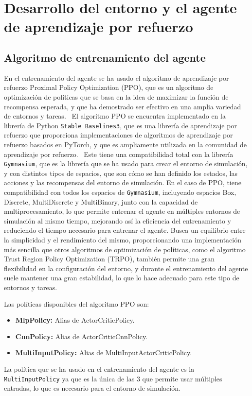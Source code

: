 \section{Desarrollo del entorno y el agente de aprendizaje por refuerzo}

\subsection{Algoritmo de entrenamiento del agente}
En el entrenamiento del agente se ha usado el algoritmo de aprendizaje por refuerzo Proximal Policy Optimization (PPO), que es un algoritmo de optimización de políticas que se basa en la idea de maximizar la función de recompensa esperada, y que ha demostrado ser efectivo en una amplia variedad de entornos y tareas.~\cite{Siboo2023, Yu2022}
El algoritmo PPO se encuentra implementado en la librería de Python \texttt{Stable Baselines3}, que es una librería de aprendizaje por refuerzo que proporciona implementaciones de algoritmos de aprendizaje por refuerzo basados en PyTorch, y que es ampliamente utilizada en la comunidad de aprendizaje por refuerzo.~\cite{Raffin2021}
Este tiene una compatibilidad total con la librería \texttt{Gymnasium}, que es la librería que se ha usado para crear el entorno de simulación, y con distintos tipos de espacios, que son cómo se han definido los estados, las acciones y las recompensas del entorno de simulación. En el caso de PPO, tiene compatibilidad con todos los espacios de \texttt{Gymnasium}, incluyendo espacios Box, Discrete, MultiDiscrete y MultiBinary, junto con la capacidad de multiprocesamiento, lo que permite entrenar el agente en múltiples entornos de simulación al mismo tiempo, mejorando así la eficiencia del entrenamiento y reduciendo el tiempo necesario para entrenar el agente.
Busca un equilibrio entre la simplicidad y el rendimiento del mismo, proporcionando una implementación más sencilla que otros algoritmos de optimización de políticas, como el algoritmo Trust Region Policy Optimization (TRPO), también permite una gran flexibilidad en la configuración del entorno, y durante el entrenamiento del agente suele mantener una gran estabilidad, lo que lo hace adecuado para este tipo de entornos y tareas.

Las políticas disponibles del algoritmo PPO son:
\begin{itemize}
    \item \textbf{MlpPolicy:} Alias de ActorCriticPolicy.
    \item \textbf{CnnPolicy:} Alias de ActorCriticCnnPolicy.
    \item \textbf{MultiInputPolicy:} Alias de MultiInputActorCriticPolicy.
\end{itemize}
La política que se ha usado en el entrenamiento del agente es la \texttt{MultiInputPolicy} ya que es la única de las 3 que permite usar múltiples entradas, lo que es necesario para el entorno de simulación.

